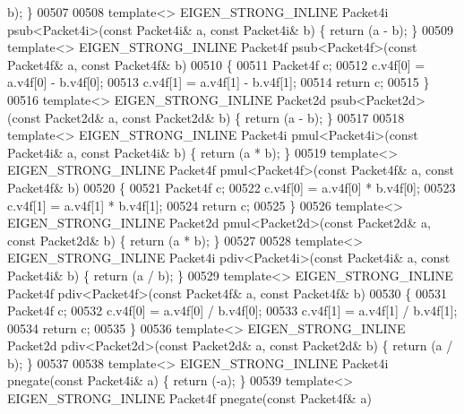 \begin{DoxyCode}
{      b); \}
00507 
00508 \textcolor{keyword}{template}<> EIGEN\_STRONG\_INLINE Packet4i psub<Packet4i>(\textcolor{keyword}{const} Packet4i& a, \textcolor{keyword}{const} Packet4i& b) \{ \textcolor{keywordflow}{return} (a - 
      b); \}
00509 \textcolor{keyword}{template}<> EIGEN\_STRONG\_INLINE Packet4f psub<Packet4f>(\textcolor{keyword}{const} Packet4f& a, \textcolor{keyword}{const} Packet4f& b)
00510 \{
00511   Packet4f c;
00512   c.v4f[0] = a.v4f[0] - b.v4f[0];
00513   c.v4f[1] = a.v4f[1] - b.v4f[1];
00514   \textcolor{keywordflow}{return} c;
00515 \}
00516 \textcolor{keyword}{template}<> EIGEN\_STRONG\_INLINE Packet2d psub<Packet2d>(\textcolor{keyword}{const} Packet2d& a, \textcolor{keyword}{const} Packet2d& b) \{ \textcolor{keywordflow}{return} (a - 
      b); \}
00517 
00518 \textcolor{keyword}{template}<> EIGEN\_STRONG\_INLINE Packet4i pmul<Packet4i>(\textcolor{keyword}{const} Packet4i& a, \textcolor{keyword}{const} Packet4i& b) \{ \textcolor{keywordflow}{return} (a * 
      b); \}
00519 \textcolor{keyword}{template}<> EIGEN\_STRONG\_INLINE Packet4f pmul<Packet4f>(\textcolor{keyword}{const} Packet4f& a, \textcolor{keyword}{const} Packet4f& b)
00520 \{
00521   Packet4f c;
00522   c.v4f[0] = a.v4f[0] * b.v4f[0];
00523   c.v4f[1] = a.v4f[1] * b.v4f[1];
00524   \textcolor{keywordflow}{return} c;
00525 \}
00526 \textcolor{keyword}{template}<> EIGEN\_STRONG\_INLINE Packet2d pmul<Packet2d>(\textcolor{keyword}{const} Packet2d& a, \textcolor{keyword}{const} Packet2d& b) \{ \textcolor{keywordflow}{return} (a * 
      b); \}
00527 
00528 \textcolor{keyword}{template}<> EIGEN\_STRONG\_INLINE Packet4i pdiv<Packet4i>(\textcolor{keyword}{const} Packet4i& a, \textcolor{keyword}{const} Packet4i& b) \{ \textcolor{keywordflow}{return} (a / 
      b); \}
00529 \textcolor{keyword}{template}<> EIGEN\_STRONG\_INLINE Packet4f pdiv<Packet4f>(\textcolor{keyword}{const} Packet4f& a, \textcolor{keyword}{const} Packet4f& b)
00530 \{
00531   Packet4f c;
00532   c.v4f[0] = a.v4f[0] / b.v4f[0];
00533   c.v4f[1] = a.v4f[1] / b.v4f[1];
00534   \textcolor{keywordflow}{return} c;
00535 \}
00536 \textcolor{keyword}{template}<> EIGEN\_STRONG\_INLINE Packet2d pdiv<Packet2d>(\textcolor{keyword}{const} Packet2d& a, \textcolor{keyword}{const} Packet2d& b) \{ \textcolor{keywordflow}{return} (a / 
      b); \}
00537 
00538 \textcolor{keyword}{template}<> EIGEN\_STRONG\_INLINE Packet4i pnegate(\textcolor{keyword}{const} Packet4i& a) \{ \textcolor{keywordflow}{return} (-a); \}
00539 \textcolor{keyword}{template}<> EIGEN\_STRONG\_INLINE Packet4f pnegate(\textcolor{keyword}{const} Packet4f& a)
}
\end{DoxyCode}
